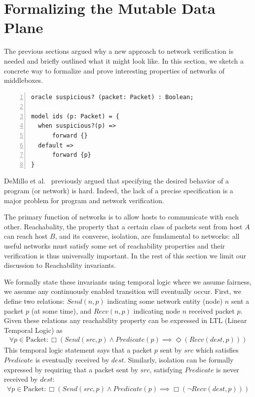 \section{Formalizing the Mutable Data Plane}
\label{sec:formal}
The previous sections argued why a new approach to network verification is needed and briefly outlined what it might look like.
In this section, we sketch a concrete way to formalize and prove interesting  properties of networks of middleboxes.

\begin{lstlisting}[caption={Model for an IDS},label=list:ids,captionpos=t,float,abovecaptionskip=-\medskipamount,
                    numbers=left,
                    morekeywords={oracle, model, when, default, state, forward},belowskip=-0.1in]
oracle suspicious? (packet: Packet) : Boolean;

model ids (p: Packet) = {
  when suspicious?(p) =>
      forward {}
  default =>
      forward {p}
}
\end{lstlisting}

DeMillo et al.~\cite{popl:DeMilloLP77} previously argued that specifying the desired behavior of a program (or network) is hard. 
Indeed, the lack of a precise specification is a major problem for program and network verification. 

The primary function of networks is to allow hosts to communicate with each other. Reachabality, the property that a certain class of packets sent from host $A$ can reach host $B$, and its converse, isolation, are fundamental to networks: all useful networks must satisfy some set of reachability properties and their verification is thus universally important. In the rest of this section we limit our discussion to Reachability invariants.

We formally state these invariants using temporal logic where we assume fairness, \ie we assume any continuously enabled transition will eventually occur. 
First, we define two relations: $Send(n, p)$ indicating some network entity (node) $n$ sent
a packet $p$ (at some time), and $Recv(n, p)$ indicating node $n$ received packet $p$. Given these relations any reachability property can be expressed in
LTL (Linear Temporal Logic) as
\begin{align*}
\forall p\in \text{Packet}: \Box (Send(src, p) \land Predicate(p) \implies \Diamond(Recv(dest, p)))
\end{align*}
This temporal logic statement says that a packet $p$ sent by $src$ which satisfies $Predicate$ is eventually received by $dest$.
Similarly, isolation can be formally expressed by requiring that a packet sent by $src$, satisfying $Predicate$ is never received by $dest$:
\begin{align*}
\forall p\in \text{Packet}: \Box (Send(src, p) \land Predicate(p) \implies \Box(\neg Recv(dest, p)))
\end{align*}

